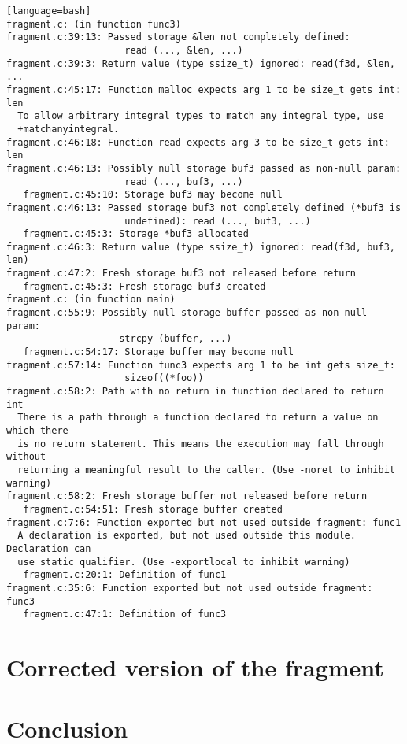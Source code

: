 \documentclass[a4paper,12pt]{article}
\begin{document}
\begin{lstlisting}[style=DOS][language=bash]
fragment.c: (in function func3)
fragment.c:39:13: Passed storage &len not completely defined:
                     read (..., &len, ...)
fragment.c:39:3: Return value (type ssize_t) ignored: read(f3d, &len, ...
fragment.c:45:17: Function malloc expects arg 1 to be size_t gets int: len
  To allow arbitrary integral types to match any integral type, use
  +matchanyintegral.
fragment.c:46:18: Function read expects arg 3 to be size_t gets int: len
fragment.c:46:13: Possibly null storage buf3 passed as non-null param:
                     read (..., buf3, ...)
   fragment.c:45:10: Storage buf3 may become null
fragment.c:46:13: Passed storage buf3 not completely defined (*buf3 is
                     undefined): read (..., buf3, ...)
   fragment.c:45:3: Storage *buf3 allocated
fragment.c:46:3: Return value (type ssize_t) ignored: read(f3d, buf3, len)
fragment.c:47:2: Fresh storage buf3 not released before return
   fragment.c:45:3: Fresh storage buf3 created
fragment.c: (in function main)
fragment.c:55:9: Possibly null storage buffer passed as non-null param:
                    strcpy (buffer, ...)
   fragment.c:54:17: Storage buffer may become null
fragment.c:57:14: Function func3 expects arg 1 to be int gets size_t:
                     sizeof((*foo))
fragment.c:58:2: Path with no return in function declared to return int
  There is a path through a function declared to return a value on which there
  is no return statement. This means the execution may fall through without
  returning a meaningful result to the caller. (Use -noret to inhibit warning)
fragment.c:58:2: Fresh storage buffer not released before return
   fragment.c:54:51: Fresh storage buffer created
fragment.c:7:6: Function exported but not used outside fragment: func1
  A declaration is exported, but not used outside this module. Declaration can
  use static qualifier. (Use -exportlocal to inhibit warning)
   fragment.c:20:1: Definition of func1
fragment.c:35:6: Function exported but not used outside fragment: func3
   fragment.c:47:1: Definition of func3

\end{lstlisting}
\section{Corrected version of the fragment}



\section{Conclusion}
\end{document}
